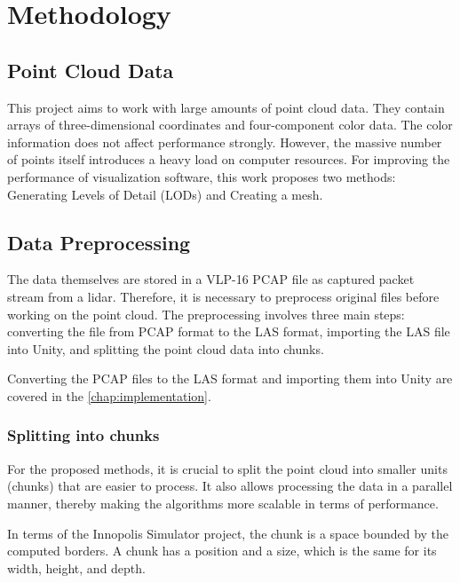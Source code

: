 \chapter{Methodology}
\label{chap:methodology}

\graphicspath{{figs/methodology/}}

\section{Point Cloud Data}
\label{sec:point_cloud_data}

This project aims to work with large amounts of point cloud data. They contain arrays of three-dimensional coordinates and four-component color data. The color information does not affect performance strongly. However, the massive number of points itself introduces a heavy load on computer resources. For improving the performance of visualization software, this work proposes two methods: Generating Levels of Detail (LODs) and Creating a mesh.


\section{Data Preprocessing}
\label{sec:data_preprocessing}

The data themselves are stored in a VLP-16 PCAP file as captured packet stream from a lidar. Therefore, it is necessary to preprocess original files before working on the point cloud. The preprocessing involves three main steps: converting the file from PCAP format to the LAS format, importing the LAS file into Unity, and splitting the point cloud data into chunks.

Converting the PCAP files to the LAS format and importing them into Unity are covered in the \autoref{chap:implementation}.

\subsection{Splitting into chunks}

For the proposed methods, it is crucial to split the point cloud into smaller units (chunks) that are easier to process. It also allows processing the data in a parallel manner, thereby making the algorithms more scalable in terms of performance.

In terms of the Innopolis Simulator project, the chunk is a space bounded by the computed borders. A chunk has a position and a size, which is the same for its width, height, and depth.


